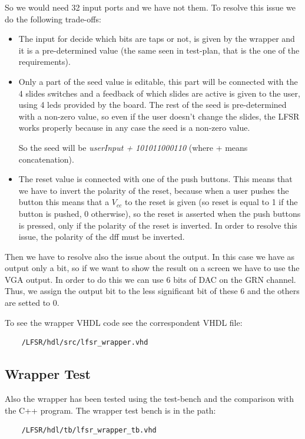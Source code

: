 \documentclass[a4paper]{report}
\begin{document}
\noindent So we would need 32 input ports and we have not them. To resolve this issue we do the following trade-offs:
\begin{itemize}
	\item The input for decide which bits are taps or not, is given by the wrapper and it is a pre-determined value (the same seen in test-plan, that is the one of the requirements).
	\item Only a part of the seed value is editable, this part will be connected with the 4 slides switches and a feedback of which slides are active is given to the user, using 4 leds provided by the board. The rest of the seed is pre-determined with a non-zero value, so even if the user doesn't change the slides, the LFSR works properly because in any case the seed is a non-zero value.
	
	\noindent
	So the seed will be \emph{userInput + 101011000110} (where + means concatenation).
	
	\item The reset value is connected with one of the push buttons. This means that we have to invert the polarity of the reset, because when a user pushes the button this means that a $V_{cc}$ to the reset is given (so reset is equal to 1 if the button is pushed, 0 otherwise), so the reset is asserted when the push buttons is pressed, only if the polarity of the reset is inverted. In order to resolve this issue, the polarity of the dff must be inverted.
\end{itemize}

\noindent Then we have to resolve also the issue about the output. In this case we have as output only a bit, so if we want to show the result on a screen we have to use the VGA output. In order to do this we can use 6 bits of DAC on the GRN channel. Thus, we assign the output bit to the less significant bit of these 6 and the others are setted to 0.

\noindent To see the wrapper VHDL code see the correspondent VHDL file:
\begin{Verbatim}
	/LFSR/hdl/src/lfsr_wrapper.vhd
\end{Verbatim}

\subsection{Wrapper Test}
\noindent Also the wrapper has been tested using the test-bench and the comparison with the C++ program. The wrapper test bench is in the path:
\begin{Verbatim}
	/LFSR/hdl/tb/lfsr_wrapper_tb.vhd
\end{Verbatim}
\end{document}
